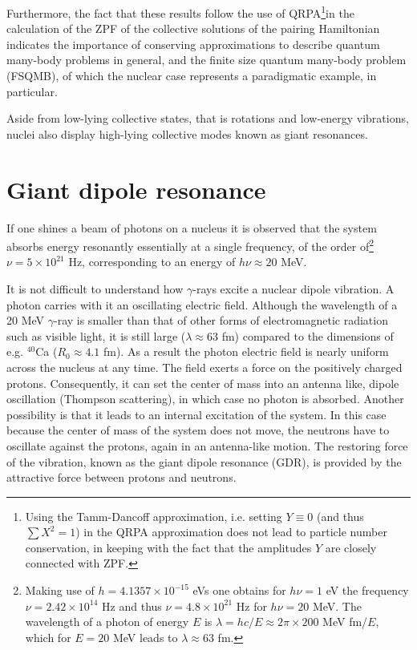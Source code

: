 \documentclass[a4paper,11pt]{book}
\numberwithin{equation}{section}
\numberwithin{figure}{section}
\numberwithin{table}{section}
\begin{document}
Furthermore, the fact that these results follow the use of QRPA\footnote{Using the Tamm-Dancoff approximation, i.e. setting $Y\equiv0$ (and thus $\sum X^2=1$) in the QRPA approximation does not lead to particle number conservation, in keeping with the fact that the amplitudes $Y$ are closely connected with ZPF.}in the calculation of the ZPF of the collective solutions of the pairing Hamiltonian indicates the importance of conserving approximations to describe quantum many-body problems in general, and the finite size quantum many-body problem (FSQMB), of which the nuclear case represents a paradigmatic example, in particular. 

Aside from low-lying collective states, that is rotations and low-energy vibrations, nuclei also display high-lying collective modes known as giant resonances.
\section{Giant dipole resonance}
If one shines a beam of photons on a nucleus it is observed that the system 
absorbs energy resonantly essentially at a single frequency, of the order of\footnote{Making use of $h=4.1357\times10^{-15}$ eVs one obtains for $h\nu=1$ eV the frequency $\nu=2.42\times10^{14}$ Hz and thus $\nu=4.8\times10^{21}$ Hz for $h\nu=20$ MeV. The wavelength of a photon of energy $E$ is $\lambda=hc/E\approx2\pi\times200$ MeV fm/$E$, which for $E=20$ MeV leads to $\lambda\approx63$ fm.} $\nu=5\times10^{21}$ Hz, corresponding to an energy of $h\nu\approx20$ MeV.

It is not difficult to understand how $\gamma$-rays excite a nuclear dipole vibration. A photon carries with it an oscillating electric field. Although the wavelength of a 20 MeV $\gamma$-ray is smaller than that of other forms of electromagnetic radiation such as visible light, it is still large ($\lambda\approx63$ fm) compared to the dimensions of e.g. $^{40}$Ca ($R_0\approx4.1$ fm). As a result the photon electric field is nearly uniform across the nucleus at any time. The field exerts a force on the positively charged protons. Consequently, it can set the center of mass into an antenna like, dipole oscillation (Thompson scattering), in which case no photon is absorbed. Another possibility is that it leads to an internal excitation of the system. In this case because the center of mass of the system does not move, the neutrons have to oscillate against the protons, again in an antenna-like motion. The restoring force of the vibration, known as the giant dipole resonance (GDR), is provided by the attractive force between protons and neutrons.
\end{document}
